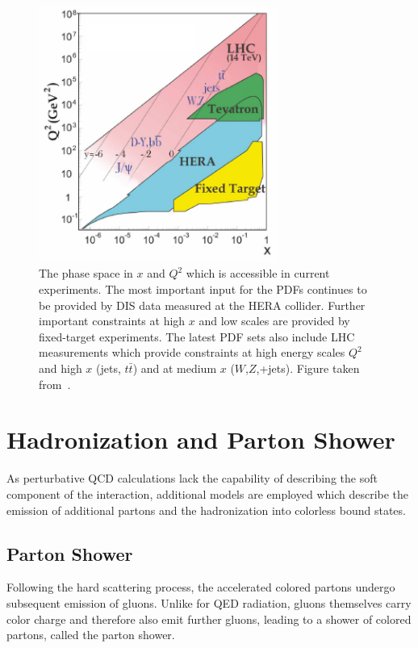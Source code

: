 \begin{figure}[htb] 
    \centering
    \includegraphics[width=0.7\textwidth]{figures/theoretical_foundations/phasespace.pdf}\hfill
    \caption[Kinematic phase space region of the experiments]{The phase space
        in $x$ and $Q^2$ which is accessible in current experiments.  The most
        important input for the PDFs continues to be provided by DIS
        data measured at the HERA collider. Further important constraints at
        high $x$ and low scales are provided by fixed-target experiments. The
        latest PDF sets also include LHC measurements which provide constraints
        at high energy scales $Q^2$ and high $x$ (jets, $t\bar t$) and at medium $x$
        ($W$,$Z$,+jets). Figure taken from~\cite{Agashe:2014kda}.} 
    \label{fig:kinematic_phasepace} 
\end{figure}

\section{Hadronization and Parton Shower}

As perturbative QCD calculations lack the capability of describing the
soft component of the interaction, additional models are employed which describe
the emission of additional partons and the hadronization into colorless bound
states. 

\subsection{Parton Shower}

Following the hard scattering process, the accelerated colored partons undergo
subsequent emission of gluons. Unlike for QED radiation, gluons themselves carry
color charge and therefore also emit further gluons, leading to a shower of
colored partons, called the parton shower.

